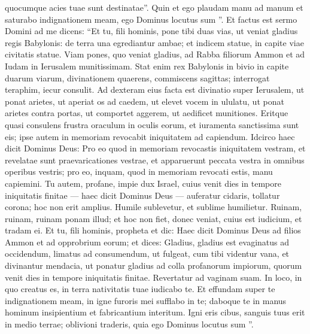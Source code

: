 \begin{biblechapter}
\begin{biblechapter}
\begin{biblechapter}
\begin{biblechapter}
\begin{biblechapter}
\begin{biblechapter}
\begin{biblechapter}
\begin{biblechapter}
\begin{biblechapter}
\begin{biblechapter}
\begin{biblechapter}
\begin{biblechapter}
\begin{biblechapter}
\begin{biblechapter}
\begin{biblechapter}
\begin{biblechapter}
\begin{biblechapter}
\begin{biblechapter}
\begin{biblechapter}
\begin{biblechapter}
\begin{biblechapter}
 quocumque acies tuae sunt destinatae”.
 \verse Quin et ego plaudam manu ad manum
 et saturabo indignationem meam,
 ego Dominus locutus sum ”.
 \verse Et factus est sermo Domini ad me dicens: 
\verse “Et tu, fili hominis, pone tibi duas vias, ut veniat gladius regis Babylonis: de terra una egrediantur ambae; et indicem statue, in capite viae civitatis statue. 
\verse Viam pones, quo veniat gladius, ad Rabba filiorum Ammon et ad Iudam in Ierusalem munitissimam. 
\verse Stat enim rex Babylonis in bivio in capite duarum viarum, divinationem quaerens, commiscens sagittas; interrogat teraphim, iecur consulit. 
 \verse Ad dexteram eius facta est divinatio super Ierusalem, ut ponat arietes, ut aperiat os ad caedem, ut elevet vocem in ululatu, ut ponat arietes contra portas, ut comportet aggerem, ut aedificet munitiones. 
\verse Eritque quasi consulens frustra oraculum in oculis eorum, et iuramenta sanctissima sunt eis; ipse autem in memoriam revocabit iniquitatem ad capiendum. 
\verse Idcirco haec dicit Dominus Deus: Pro eo quod in memoriam revocastis iniquitatem vestram, et revelatae sunt praevaricationes vestrae, et apparuerunt peccata vestra in omnibus operibus vestris; pro eo, inquam, quod in memoriam revocati estis, manu capiemini. 
\verse Tu autem, profane, impie dux Israel, cuius venit dies in tempore iniquitatis finitae — 
\verse haec dicit Dominus Deus — auferatur cidaris, tollatur corona; hoc non erit amplius. Humile sublevetur, et sublime humilietur. 
\verse Ruinam, ruinam, ruinam ponam illud; et hoc non fiet, donec veniat, cuius est iudicium, et tradam ei.
 \verse Et tu, fili hominis, propheta et dic: Haec dicit Dominus Deus ad filios Ammon et ad opprobrium eorum; et dices: Gladius, gladius est evaginatus ad occidendum, limatus ad consumendum, ut fulgeat, 
\verse cum tibi videntur vana, et divinantur mendacia, ut ponatur gladius ad colla profanorum impiorum, quorum venit dies in tempore iniquitatis finitae. 
\verse Revertatur ad vaginam suam. In loco, in quo creatus es, in terra nativitatis tuae iudicabo te. 
\verse Et effundam super te indignationem meam, in igne furoris mei sufflabo in te; daboque te in manus hominum insipientium et fabricantium interitum. 
\verse Igni eris cibus, sanguis tuus erit in medio terrae; oblivioni traderis, quia ego Dominus locutus sum ”.
 

\end{biblechapter}
\end{biblechapter}
\end{biblechapter}
\end{biblechapter}
\end{biblechapter}
\end{biblechapter}
\end{biblechapter}
\end{biblechapter}
\end{biblechapter}
\end{biblechapter}
\end{biblechapter}
\end{biblechapter}
\end{biblechapter}
\end{biblechapter}
\end{biblechapter}
\end{biblechapter}
\end{biblechapter}
\end{biblechapter}
\end{biblechapter}
\end{biblechapter}
\end{biblechapter}
